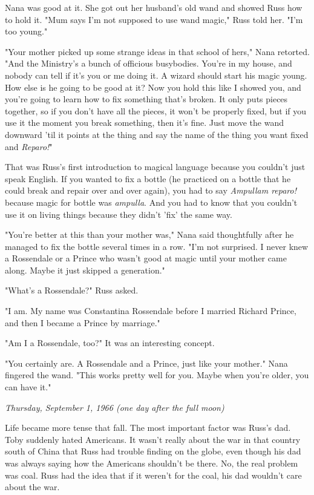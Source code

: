 \documentclass[a4paper,11pt]{article}
\begin{document}
Nana was good at it. She got out her husband's old wand and showed Russ how to hold it. "Mum says I'm not supposed to use wand magic," Russ told her. "I'm too young."

"Your mother picked up some strange ideas in that school of hers," Nana retorted. "And the Ministry's a bunch of officious busybodies. You're in my house, and nobody can tell if it's you or me doing it. A wizard should start his magic young. How else is he going to be good at it? Now you hold this like I showed you, and you're going to learn how to fix something that's broken. It only puts pieces together, so if you don't have all the pieces, it won't be properly fixed, but if you use it the moment you break something, then it's fine. Just move the wand downward 'til it points at the thing and say the name of the thing you want fixed and \emph{Reparo!}"

That was Russ's first introduction to magical language because you couldn't just speak English. If you wanted to fix a bottle (he practiced on a bottle that he could break and repair over and over again), you had to say \emph{Ampullam reparo!} because magic for bottle was \emph{ampulla}. And you had to know that you couldn't use it on living things because they didn't 'fix' the same way.

"You're better at this than your mother was," Nana said thoughtfully after he managed to fix the bottle several times in a row. "I'm not surprised. I never knew a Rossendale or a Prince who wasn't good at magic until your mother came along. Maybe it just skipped a generation."

"What's a Rossendale?" Russ asked.

"I am. My name was Constantina Rossendale before I married Richard Prince, and then I became a Prince by marriage."

"Am I a Rossendale, too?" It was an interesting concept.

"You certainly are. A Rossendale and a Prince, just like your mother." Nana fingered the wand. "This works pretty well for you. Maybe when you're older, you can have it."

\emph{Thursday, September 1, 1966 (one day after the full moon)}

Life became more tense that fall. The most important factor was Russ's dad. Toby suddenly hated Americans. It wasn't really about the war in that country south of China that Russ had trouble finding on the globe, even though his dad was always saying how the Americans shouldn't be there. No, the real problem was coal. Russ had the idea that if it weren't for the coal, his dad wouldn't care about the war.
\end{document}
